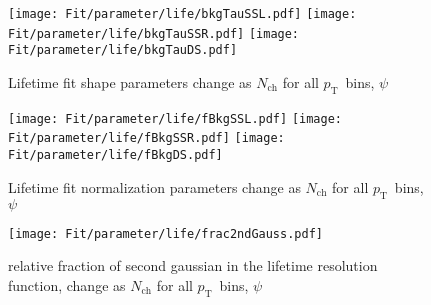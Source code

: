 \documentclass[12pt]{article}
\newcommand{\pt}{$p_{\mathrm{T}}$}
\begin{document}
\begin{figure}[htbp]
\centering
\texttt{[image: Fit/parameter/life/bkgTauSSL.pdf]}
\texttt{[image: Fit/parameter/life/bkgTauSSR.pdf]}
\texttt{[image: Fit/parameter/life/bkgTauDS.pdf]}
\caption{Lifetime fit shape parameters change as $N_\mathrm{ch}$ for all \pt\ bins, $\psi$}
\end{figure}
\clearpage

\begin{figure}[htbp]
\centering
\texttt{[image: Fit/parameter/life/fBkgSSL.pdf]}
\texttt{[image: Fit/parameter/life/fBkgSSR.pdf]}
\texttt{[image: Fit/parameter/life/fBkgDS.pdf]}
\caption{Lifetime fit normalization parameters change as $N_\mathrm{ch}$ for all \pt\ bins, $\psi$}
\end{figure}
\clearpage

\begin{figure}[htbp]
\centering
\texttt{[image: Fit/parameter/life/frac2ndGauss.pdf]}
\caption{relative fraction of second gaussian in the lifetime resolution function, change as $N_\mathrm{ch}$ for all \pt\ bins, $\psi$}
\end{figure}
\clearpage
\end{document}
